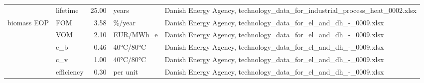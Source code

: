 \begin{longtable}{p{5cm}p{3cm}rp{3cm}p{11cm}}
                      & lifetime &          25.00 &                             years &                                                                                                                                                                                                                                                          Danish Energy Agency, technology\_data\_for\_industrial\_process\_heat\_0002.xlsx \\
biomass EOP & FOM &           3.58 &                            \%/year &                                                                                                                                                                                                                                                                      Danish Energy Agency, technology\_data\_for\_el\_and\_dh\_-\_0009.xlsx \\
                      & VOM &           2.10 &                         EUR/MWh\_e &                                                                                                                                                                                                                                                                      Danish Energy Agency, technology\_data\_for\_el\_and\_dh\_-\_0009.xlsx \\
                      & c\_b &           0.46 &                         40°C/80°C &                                                                                                                                                                                                                                                                      Danish Energy Agency, technology\_data\_for\_el\_and\_dh\_-\_0009.xlsx \\
                      & c\_v &           1.00 &                         40°C/80°C &                                                                                                                                                                                                                                                                      Danish Energy Agency, technology\_data\_for\_el\_and\_dh\_-\_0009.xlsx \\
                      & efficiency &           0.30 &                          per unit &                                                                                                                                                                                                                                                                      Danish Energy Agency, technology\_data\_for\_el\_and\_dh\_-\_0009.xlsx \\

\end{longtable}

